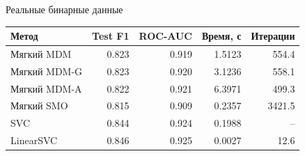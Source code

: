\SPBGContentSlide
  {Реальные бинарные данные}
  {%
    \centering
    \SmallBody
    \renewcommand{\arraystretch}{1.16}
    \begin{tabular}{@{}lrrrr@{}}
      \toprule
      Метод & Test F1 & ROC-AUC & Время, с & Итерации \\
      \midrule
      Мягкий MDM & 0.823 & 0.919 & 1.5123 & 554.4 \\
      Мягкий MDM-G & 0.823 & 0.920 & 3.1236 & 558.1 \\
      Мягкий MDM-A & 0.822 & 0.921 & 6.3971 & 499.3 \\
      Мягкий SMO & 0.815 & 0.909 & 0.2357 & 3421.5 \\
      SVC & 0.844 & 0.924 & 0.1988 & -- \\
      LinearSVC & 0.846 & 0.925 & 0.0027 & 12.6 \\
      \bottomrule
    \end{tabular}
  }
